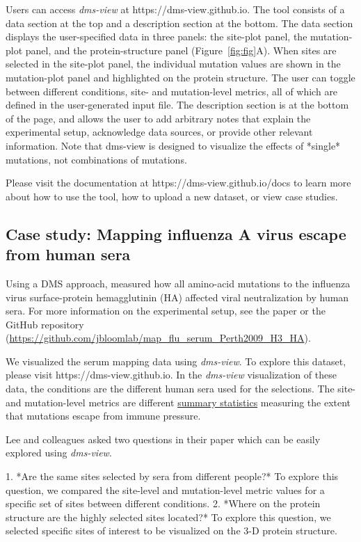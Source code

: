 Users can access \emph{dms-view} at https://dms-view.github.io.
The tool consists of a data section at the top and a description section at the bottom.
The data section displays the user-specified data in three panels: the site-plot panel, the mutation-plot panel, and the protein-structure panel (Figure~\ref{fig:fig}A).
When sites are selected in the site-plot panel, the individual mutation values are shown in the mutation-plot panel and highlighted on the protein structure.
The user can toggle between different conditions, site- and mutation-level metrics, all of which are defined in the user-generated input file.
The description section is at the bottom of the page, and allows the user to add arbitrary notes that explain the experimental setup, acknowledge data sources, or provide other relevant information.
Note that dms-view is designed to visualize the effects of *single* mutations, not combinations of mutations.

Please visit the documentation at https://dms-view.github.io/docs to learn more about how to use the tool, how to upload a new dataset, or view case studies.

\subsection{Case study: Mapping influenza A virus escape from human sera}

Using a DMS approach, \citet{lee2019mapping} measured how all amino-acid mutations to the influenza virus surface-protein hemagglutinin (HA) affected viral neutralization by human sera.
For more information on the experimental setup, see the paper \citep{lee2019mapping} or the GitHub repository (\url{https://github.com/jbloomlab/map_flu_serum_Perth2009_H3_HA}).

We visualized the \citet{lee2019mapping} serum mapping data using \emph{dms-view}.
To explore this dataset, please visit https://dms-view.github.io.
In the \emph{dms-view} visualization of these data, the conditions are the different human sera used for the selections.
The site- and mutation-level metrics are different \href{https://jbloomlab.github.io/dms_tools2/diffsel.html}{summary statistics} measuring the extent that mutations escape from immune pressure.

Lee and colleagues asked two questions in their paper which can be easily explored using \emph{dms-view}.

  1. *Are the same sites selected by sera from different people?* To explore this question, we compared the site-level and mutation-level metric values for a specific set of sites between different conditions.
  2. *Where on the protein structure are the highly selected sites located?* To explore this question, we selected specific sites of interest to be visualized on the 3-D protein structure.

